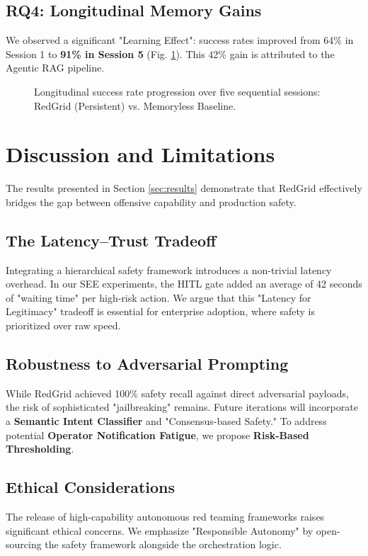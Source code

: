 \documentclass[conference]{IEEEtran}
\begin{document}
\subsection{RQ4: Longitudinal Memory Gains}
We observed a significant "Learning Effect": success rates improved from 64\% in Session 1 to \textbf{91\% in Session 5} (Fig. \ref{fig:memory_gain}). This 42\% gain is attributed to the Agentic RAG pipeline.

\begin{figure}[h]
\centering

\caption{Longitudinal success rate progression over five sequential sessions: RedGrid (Persistent) vs. Memoryless Baseline.}
\label{fig:memory_gain}
\end{figure}

\section{Discussion and Limitations}
\label{sec:discussion}

The results presented in Section \ref{sec:results} demonstrate that RedGrid effectively bridges the gap between offensive capability and production safety.

\subsection{The Latency--Trust Tradeoff}
Integrating a hierarchical safety framework introduces a non-trivial latency overhead. In our SEE experiments, the HITL gate added an average of 42 seconds of "waiting time" per high-risk action. We argue that this "Latency for Legitimacy" tradeoff is essential for enterprise adoption, where safety is prioritized over raw speed.

\subsection{Robustness to Adversarial Prompting}
While RedGrid achieved 100\% safety recall against direct adversarial payloads, the risk of sophisticated "jailbreaking" remains. Future iterations will incorporate a \textbf{Semantic Intent Classifier} and "Consensus-based Safety." To address potential \textbf{Operator Notification Fatigue}, we propose \textbf{Risk-Based Thresholding}.

\subsection{Ethical Considerations}
The release of high-capability autonomous red teaming frameworks raises significant ethical concerns. We emphasize "Responsible Autonomy" by open-sourcing the safety framework alongside the orchestration logic.
\end{document}
